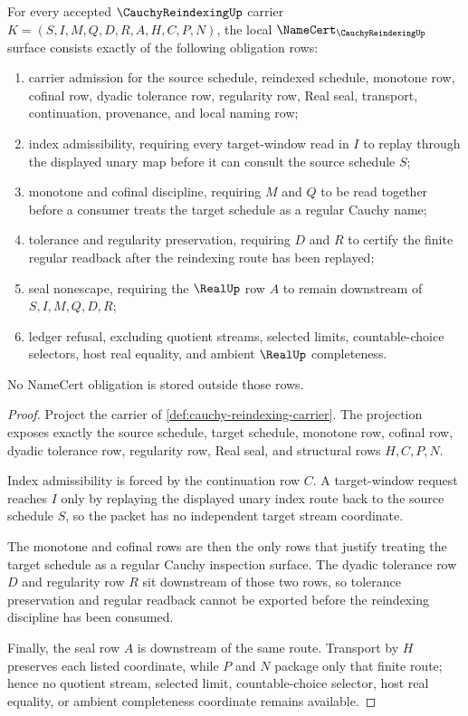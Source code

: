 \begin{theorem}
\label{thm:cauchy-reindexing-namecert-obligations}
For every accepted $\CauchyReindexingUp$ carrier $K=(S,I,M,Q,D,R,A,H,C,P,N)$, the local $\NameCert_{\CauchyReindexingUp}$ surface consists exactly of the following obligation rows:
\begin{enumerate}
\item carrier admission for the source schedule, reindexed schedule, monotone row, cofinal row, dyadic tolerance row, regularity row, Real seal, transport, continuation, provenance, and local naming row;
\item index admissibility, requiring every target-window read in $I$ to replay through the displayed unary map before it can consult the source schedule $S$;
\item monotone and cofinal discipline, requiring $M$ and $Q$ to be read together before a consumer treats the target schedule as a regular Cauchy name;
\item tolerance and regularity preservation, requiring $D$ and $R$ to certify the finite regular readback after the reindexing route has been replayed;
\item seal nonescape, requiring the $\RealUp$ row $A$ to remain downstream of $S,I,M,Q,D,R$;
\item ledger refusal, excluding quotient streams, selected limits, countable-choice selectors, host real equality, and ambient $\RealUp$ completeness.
\end{enumerate}
No NameCert obligation is stored outside those rows.
\end{theorem}
\begin{proof}
Project the carrier of \autoref{def:cauchy-reindexing-carrier}. The projection exposes exactly the source schedule, target schedule, monotone row, cofinal row, dyadic tolerance row, regularity row, Real seal, and structural rows $H,C,P,N$.

Index admissibility is forced by the continuation row $C$. A target-window request reaches $I$ only by replaying the displayed unary index route back to the source schedule $S$, so the packet has no independent target stream coordinate.

The monotone and cofinal rows are then the only rows that justify treating the target schedule as a regular Cauchy inspection surface. The dyadic tolerance row $D$ and regularity row $R$ sit downstream of those two rows, so tolerance preservation and regular readback cannot be exported before the reindexing discipline has been consumed.

Finally, the seal row $A$ is downstream of the same route. Transport by $H$ preserves each listed coordinate, while $P$ and $N$ package only that finite route; hence no quotient stream, selected limit, countable-choice selector, host real equality, or ambient completeness coordinate remains available.
\end{proof}

